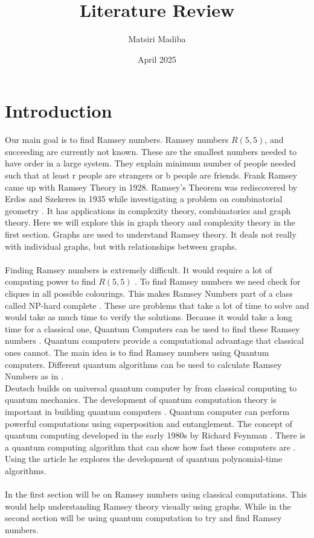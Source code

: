 \documentclass[15pt, a4paper]{Assignment}
\author{Matsiri Madiba}
\date{April 2025}
\title{Literature Review}
\begin{document}
\maketitle

\section*{Introduction}
Our main goal is to find Ramsey numbers.
Ramsey numbers $R(5,5)$, and succeeding are currently not known.
These are the smallest numbers needed to have order in a large system.
They explain minimum number of people needed such that at least r people are strangers or b people are friends.
 Frank Ramsey came up with Ramsey Theory in 1928.
Ramsey's Theorem was rediscovered by Erd$\ddot{o}$s and Szekeres in 1935 while investigating a problem on combinatorial geometry \cite{BondyMurty2008}.									
It has applications in complexity theory, combinatorics and graph theory. 
Here we will explore this in graph theory and complexity theory in the first section.
Graphs are used to understand Ramsey theory.
It deals not really with individual graphs, but with relationships between graphs.							
\\\\
Finding Ramsey numbers is extremely difficult.
It would require a lot of computing power to find $R(5,5)$ \cite{spencer1994}.
To find Ramsey numbers we need check for cliques in all possible colourings.
This makes Ramsey Numbers part of a class called NP-hard complete  \cite{burr1981generalized}. 
These are problems that take a lot of time to solve and would take as much time to verify the solutions. 
Because it would take a long time for a classical one,
Quantum Computers can be used to find these Ramsey numbers \cite{PhysRevA.93.032301}.
Quantum computers provide a computational advantage that classical ones cannot.
The main idea is to find Ramsey numbers using Quantum computers.
Different quantum algorithms can be used to calculate Ramsey Numbers as in \cite{gaitan2012ramsey, PhysRevA.93.032301}.
\newline
\\
Deutsch \cite{Deutsch1989} builds on universal quantum computer by \cite{deutsch1985quantum} from classical computing to quantum mechanics. 
The development of quantum computation theory is important in building quantum computers \cite{Deutsch1989}.
Quantum computer can perform powerful computations using superposition and entanglement.
The concept of quantum computing developed in the early 1980s by Richard Feynman  \cite{feynman1982simulating}. 
There is a quantum computing algorithm that can show how fast these computers are	\cite{doi:10.1137/S0097539796298637}.
Using the article \cite{shor1994algorithms} he explores the development of quantum polynomial-time algorithms.
\\\\
In the first section will be on Ramsey numbers using classical computations. 
This would help understanding Ramsey theory visually using graphs.
While in the second section will be using quantum computation to try and find Ramsey numbers.
\end{document}
